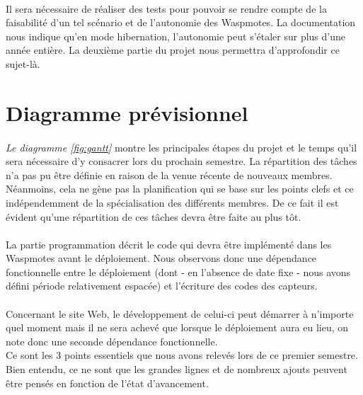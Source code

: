     \paragraph{}Il sera nécessaire de réaliser des tests pour pouvoir se rendre compte de la faisabilité d'un tel scénario et de l'autonomie des Waspmotes. La documentation nous indique qu'en mode hibernation, l'autonomie peut s'étaler sur plus d'une année entière. La deuxième partie du projet nous permettra d'approfondir ce sujet-là. 
    


\section{Diagramme prévisionnel}
    \paragraph{}\textit{Le diagramme \ref{fig:gantt}} montre les principales étapes du projet et le temps qu'il sera nécessaire d'y consacrer lors du prochain semestre. La répartition des tâches n'a pas pu être définie en raison de la venue récente de nouveaux membres. Néanmoins, cela ne gène pas la planification qui se base sur les points clefs et ce indépendemment de la spécialisation des différents membres. De ce fait il est évident qu'une répartition de ces tâches devra être faite au plus tôt.
    
    \paragraph{}La partie programmation décrit le code qui devra être implémenté dans les Waspmotes avant le déploiement. Nous observons donc une dépendance fonctionnelle entre le déploiement (dont - en l'absence de date fixe - nous avons défini période relativement espacée) et l'écriture des codes des capteurs.

    \paragraph{}Concernant le site Web, le développement de celui-ci peut démarrer à n'importe quel moment mais il ne sera achevé que lorsque le déploiement aura eu lieu, on note donc une seconde dépendance fonctionnelle.\\
    Ce sont les 3 points essentiels que nous avons relevés lors de ce premier semestre. Bien entendu, ce ne sont que les grandes lignes et de nombreux ajouts peuvent être pensés en fonction de l'état d'avancement.

